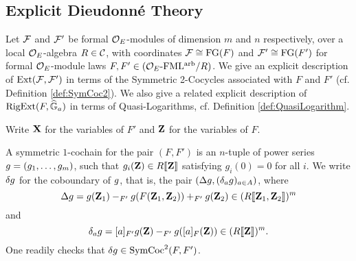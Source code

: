 \documentclass[../main.tex]{subfiles}
\begin{document}

\subsection{Explicit Dieudonné Theory} %
\label{sub:Explicit Dieudonne Theory}
Let $\mathcal{F}$ and $\mathcal{F}'$ be formal $\mathcal{O}_E$-modules of dimension $m$ and $n$ respectively,
over a local $\mathcal{O}_E$-algebra $R \in \mathcal{C}$, with coordinates 
$\mathcal{F} \cong \textnormal{FG}(F)$ and $\mathcal{F}' \cong \textnormal{FG}(F')$ for formal $\mathcal{O}_E$-module laws
$F, F' \in {({\mathcal{O}_E}\textnormal-\allowbreak\mathrm{FML^{arb}}/{R})}$. We give an explicit description of $\operatorname{Ext}(\mathcal{F},
\mathcal{F}')$ in terms of the Symmetric 2-Cocycles associated with $F$ and
$F'$ (cf. Definition \ref{def:SymCoc2}). We also give a related explicit
description of $\operatorname {RigExt}(F, \widehat{\mathbb{G}}_a)$ in terms of Quasi-Logarithms, cf.
Definition \ref{def:QuasiLogarithm}. 

Write $\mathbf{X}$ for the variables of $F'$ and $\mathbf{Z}$ for the variables of $F$.
\begin{defi} \label{def:SymCoc1}
  A symmetric $1$-cochain for the pair $(F,F')$ is an $n$-tuple of power 
  series ${g} = (g_1, \dots, g_m)$, such that $g_i(\mathbf{Z}) \in R\llbracket \mathbf{Z} \rrbracket$
  satisfying $g_i(0) = 0$ for all $i$. We write $\delta {g}$ 
  for the coboundary of ${g}$, that is, the pair $(\Delta {g}, (\delta_a
  {g})_{a \in A})$,
  where
  \begin{equation*}
    \Delta {g} = {g}(\mathbf{Z}_1) -_{F'} {g}(F(\mathbf{Z}_1,\mathbf{Z}_2)) +_{F'} {g}(\mathbf{Z}_2)
    \in (R\llbracket \mathbf{Z}_1, \mathbf{Z}_2 \rrbracket)^m
  \end{equation*}
  and 
  \begin{equation*}
    \delta_a {g} = [a]_{F'} {g}(\mathbf{Z}) -_{F'} {g}([a]_F(\mathbf{Z})) \in (R \llbracket \mathbf{Z}
    \rrbracket)^m.
  \end{equation*}
  One readily checks that $\delta {g} \in \operatorname{SymCoc}^2(F, F')$. 
\end{defi}
\end{document}
